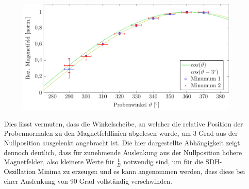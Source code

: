 \begin{figure}[h]
	\centering
	\includegraphics[scale=1]{graphs/winkel/auswertung.pdf}
	\caption[]{
		}
		\label{fig:winkel_ausw}
\end{figure}

Dies lässt vermuten, dass die Winkelscheibe, an welcher die relative Position der Probennormalen zu den Magnetfeldlinien abgelesen wurde, um 3 Grad aus der Nullposition ausgelenkt angebracht ist. 
Die hier dargestellte Abhängigkeit zeigt dennoch deutlich, dass für zunehmende Auslenkung aus der Nullposition höhere Magnetfelder, also kleinere Werte für $\frac{1}{B}$ notwendig sind, um für die SDH-Oszillation Minima zu erzeugen und es kann angenommen werden, dass diese bei einer Auslenkung von 90 Grad vollständig verschwinden. 

